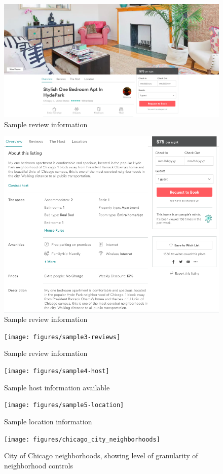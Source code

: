 \begin{figure}[!ht]\centering
	\includegraphics[width=.8\textwidth]{figures/sample1-cover}
	\caption{Sample review information}
	\label{fig:listing}
\end{figure}

\begin{figure}[!ht]\centering
	\includegraphics[width=.8\textwidth]{figures/sample2-property}
	\caption{Sample review information}
	\label{fig:property}
\end{figure}

\begin{figure}[!ht]\centering
\texttt{[image: figures/sample3-reviews]}
\caption{Sample review information}
	\label{fig:reviewinfo}
\end{figure}

\begin{figure}\centering
\texttt{[image: figures/sample4-host]}
\caption[Sample host information]{Sample host information available}
	\label{fig:host}
\end{figure}

\begin{figure}\centering
\texttt{[image: figures/sample5-location]}
\caption{Sample location information}
	\label{fig:location}
\end{figure}

\begin{figure}\centering
\texttt{[image: figures/chicago\_city\_neighborhoods]}
\caption[City of Chicago neighborhoods]{City of Chicago neighborhoods, showing level of granularity of neighborhood controls}
	\label{fig:chicago}
\end{figure}


